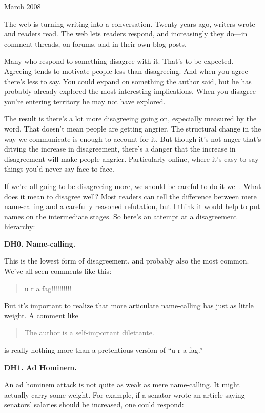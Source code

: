 March 2008

The web is turning writing into a conversation. Twenty years ago,
writers wrote and readers read. The web lets readers respond, and
increasingly they do---in comment threads, on forums, and in their own
blog posts.

Many who respond to something disagree with it. That's to be expected.
Agreeing tends to motivate people less than disagreeing. And when you
agree there's less to say. You could expand on something the author
said, but he has probably already explored the most interesting
implications. When you disagree you're entering territory he may not
have explored.

The result is there's a lot more disagreeing going on, especially
measured by the word. That doesn't mean people are getting angrier. The
structural change in the way we communicate is enough to account for it.
But though it's not anger that's driving the increase in disagreement,
there's a danger that the increase in disagreement will make people
angrier. Particularly online, where it's easy to say things you'd never
say face to face.

If we're all going to be disagreeing more, we should be careful to do it
well. What does it mean to disagree well? Most readers can tell the
difference between mere name-calling and a carefully reasoned
refutation, but I think it would help to put names on the intermediate
stages. So here's an attempt at a disagreement hierarchy:

\textbf{DH0. Name-calling.}

This is the lowest form of disagreement, and probably also the most
common. We've all seen comments like this:

\begin{quote}
u r a fag!!!!!!!!!!
\end{quote}

But it's important to realize that more articulate name-calling has just
as little weight. A comment like

\begin{quote}
The author is a self-important dilettante.
\end{quote}

is really nothing more than a pretentious version of ``u r a fag.''

\textbf{DH1. Ad Hominem.}

An ad hominem attack is not quite as weak as mere name-calling. It might
actually carry some weight. For example, if a senator wrote an article
saying senators' salaries should be increased, one could respond:

